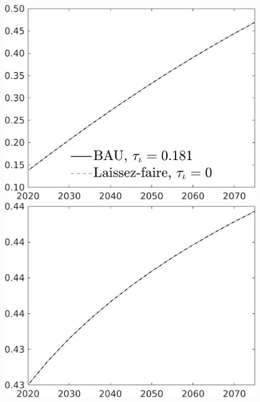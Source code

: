 \begin{figure}[h!!]
\begin{minipage}[]{0.32\textwidth}
\end{minipage}	
	\begin{minipage}[]{0.32\textwidth}
\includegraphics[width=1\textwidth]{../../codding_model/own_basedOnFried/optimalPol_010922_revision/figures/all_13Sept22/CompTaul_Equlab_LFBAU_Reg0_GFF_spillover0_nsk1_xgr1_knspil0_sep1_countec0_GovRev0_etaa0.79_lgd1.png}
\end{minipage}	
\begin{minipage}[]{0.32\textwidth}
\includegraphics[width=1\textwidth]{../../codding_model/own_basedOnFried/optimalPol_010922_revision/figures/all_13Sept22/CompTaul_Equlab_LFBAU_Reg0_EY_spillover0_nsk1_xgr1_knspil0_sep1_countec0_GovRev0_etaa0.79_lgd0.png}

\end{minipage}
\end{figure}
